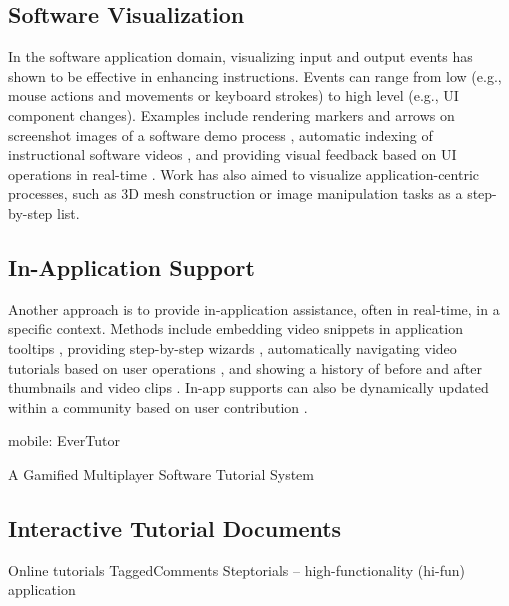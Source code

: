 \subsection{Software Visualization}

In the software application domain, visualizing input and output events has shown to be effective in enhancing instructions. Events can range from low (e.g., mouse actions and movements or keyboard strokes) to high level (e.g., UI component changes). Examples include rendering markers and arrows on screenshot images of a software demo process \cite{Nakamura:2008:ASV:1449715.1449721, Grabler:2009jj}, automatic indexing of instructional software videos \cite{Banovic:2012kd}, and providing visual feedback based on UI operations in real-time \cite{Dixon:2010fb,Dixon:2011:CHP:1978942.1979086}. Work has also aimed to visualize application-centric processes, such as 3D mesh construction \cite{Denning:2011fy} or image manipulation tasks \cite{Grabler:2009jj} as a step-by-step list.

\subsection{In-Application Support}

Another approach is to provide in-application assistance, often in real-time, in a specific context. Methods include embedding video snippets in application tooltips \cite{Grossman:2010wr}, providing step-by-step wizards \cite{Bergman:2005:DocWizards,Kelleher:2005:STD:1054972.1055047,Fernquist:2011:SRE:2047196.2047245}, automatically navigating video tutorials based on user operations \cite{Pongnumkul:2011ju}, and showing a history of before and after thumbnails and video clips \cite{Grossman:2010jz}. In-app supports can also be dynamically updated within a community based on user contribution \cite{Lafreniere:2013ff,Matejka:2009:CCR:1622176.1622214}.

mobile: EverTutor \cite{Wang:2014:EAC:2556288.2557407}

A Gamified Multiplayer Software Tutorial System \cite{Li:2014:CGM:2556288.2556954}

\subsection{Interactive Tutorial Documents}

Online tutorials
TaggedComments \cite{Bunt:2014:TPI:2556288.2557118}
Steptorials \cite{Lieberman:2014:SML:2557500.2557543} -- high-functionality (hi-fun) application

